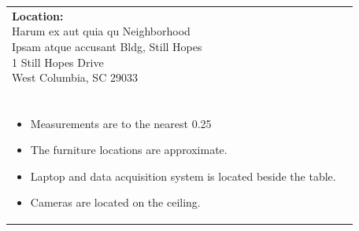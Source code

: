\documentclass[12pt]{article}
\begin{document}
    \vspace*{\fill}  %
    \begin{table}[H]
	\begin{tabular}{l l}
		\makecell[lt]{
			\textbf{Location:}\\
     		Harum ex aut quia qu Neighborhood \\
 		    Ipsam atque accusant Bldg, Still Hopes\\
           	1 Still Hopes Drive\\
           	West Columbia, SC 29033\\\\
        }   	
        &	
		\makecell[tp{5in}]{
		\textbf{Notes:}\\
		\vspace{-8mm}  %
		\begin{itemize}
			\setlength\itemsep{-3mm}  %
			\item Measurements are to the nearest \SI{0.25}{\inch}
			\item The furniture locations are approximate.
			\item Laptop and data acquisition system is located beside the table.
			\item Cameras are located on the ceiling.
		\end{itemize}
		}	
			
	\end{tabular}
	\vspace{-8mm} %
\end{table}

    
\end{document}
